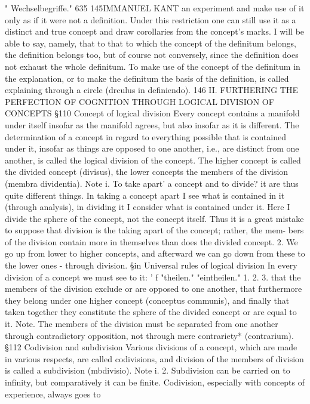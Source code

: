 {" Wechselbegriffe."
635
145IMMANUEL KANT
an experiment and make use of it only as if it were not a definition. Under
this restriction one can still use it as a distinct and true concept and draw
corollaries from the concept's marks. I will be able to say, namely, that to
that to which the concept of the definitum belongs, the definition belongs
too, but of course not conversely, since the definition does not exhaust
the whole definitum.
To make use of the concept of the definitum in the explanation, or to
make the definitum the basis of the definition, is called explaining through
a circle (drculus in definiendo).
146
II. FURTHERING THE PERFECTION
OF COGNITION THROUGH LOGICAL DIVISION
OF CONCEPTS
§110
Concept of logical division
Every concept contains a manifold under itself insofar as the manifold
agrees, but also insofar as it is different. The determination of a concept
in regard to everything possible that is contained under it, insofar as
things are opposed to one another, i.e., are distinct from one another, is
called the logical division of the concept. The higher concept is called the
divided concept (divisus), the lower concepts the members of the division
(membra dividentia).
Note i. To take apart' a concept and to divide? it are thus quite different things. In
taking a concept apart I see what is contained in it (through analysis), in
dividing it I consider what is contained under it. Here I divide the sphere
of the concept, not the concept itself. Thus it is a great mistake to
suppose that division is the taking apart of the concept; rather, the mem-
bers of the division contain more in themselves than does the divided
concept.
2. We go up from lower to higher concepts, and afterward we can go down
from these to the lower ones - through division.
§in
Universal rules of logical division
In every division of a concept we must see to it:
'
f
"theilen."
"eintheilen."
1.
2.
3.
that the members of the division exclude or are opposed to one another, that
furthermore they
belong under one higher concept (conceptus communis), and finally that
taken together they constitute the sphere of the divided concept or are equal
to it.
Note.
The members of the division must be separated from one another through
contradictory opposition, not through mere contrariety* (contrarium).
§112
Codivision and subdivision
Various divisions of a concept, which are made in various respects, are
called codivisions, and division of the members of division is called a
subdivision (mbdivisio).
Note i.
2.
Subdivision can be carried on to infinity, but comparatively it can be
finite. Codivision, especially with concepts of experience, always goes to
}
